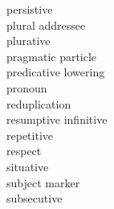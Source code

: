 \documentclass[output=paper]{langscibook}
\begin{document}
\begin{multicols}{2}
\begin{tabbing}
\PERS{} \> persistive\\
\PLA{} \> plural addressee\\
\PLUR{} \> plurative\\
\PP{} \> pragmatic particle\\
\PRL{} \> predicative lowering\\
\PRO{} \> pronoun\\
\RED{} \> reduplication\\
\RSM{} \> resumptive infinitive\\
\REP{} \> repetitive\\
\RESP{} \> respect\\
\SIT{} \> situative\\
\SM{} \> subject marker\\
\SUBS{} \> subsecutive
\end{tabbing}
\end{multicols}

\printbibliography[heading=subbibliography,notkeyword=this]
\end{document}
